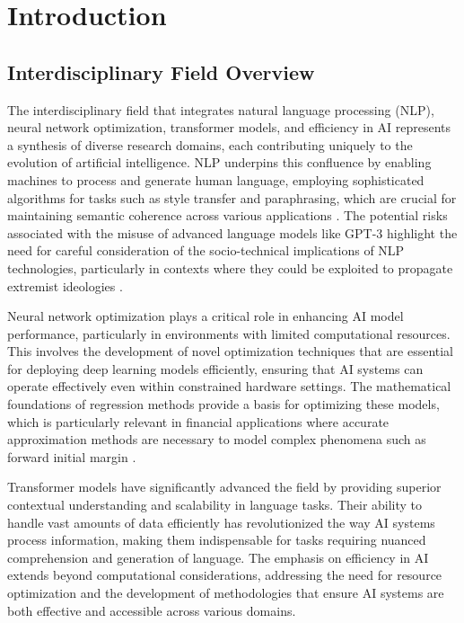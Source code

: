 \section{Introduction} \label{sec:Introduction}


\subsection{Interdisciplinary Field Overview} \label{subsec:Interdisciplinary Field Overview}

The interdisciplinary field that integrates natural language processing (NLP), neural network optimization, transformer models, and efficiency in AI represents a synthesis of diverse research domains, each contributing uniquely to the evolution of artificial intelligence. NLP underpins this confluence by enabling machines to process and generate human language, employing sophisticated algorithms for tasks such as style transfer and paraphrasing, which are crucial for maintaining semantic coherence across various applications \cite{yamshchikov2020styletransferparaphraselookingsensible}. The potential risks associated with the misuse of advanced language models like GPT-3 highlight the need for careful consideration of the socio-technical implications of NLP technologies, particularly in contexts where they could be exploited to propagate extremist ideologies \cite{mcguffie2020radicalizationrisksgpt3advanced}.



Neural network optimization plays a critical role in enhancing AI model performance, particularly in environments with limited computational resources. This involves the development of novel optimization techniques that are essential for deploying deep learning models efficiently, ensuring that AI systems can operate effectively even within constrained hardware settings. The mathematical foundations of regression methods provide a basis for optimizing these models, which is particularly relevant in financial applications where accurate approximation methods are necessary to model complex phenomena such as forward initial margin \cite{kun2022mathematicalfoundationsregressionmethods}.



Transformer models have significantly advanced the field by providing superior contextual understanding and scalability in language tasks. Their ability to handle vast amounts of data efficiently has revolutionized the way AI systems process information, making them indispensable for tasks requiring nuanced comprehension and generation of language. The emphasis on efficiency in AI extends beyond computational considerations, addressing the need for resource optimization and the development of methodologies that ensure AI systems are both effective and accessible across various domains.




